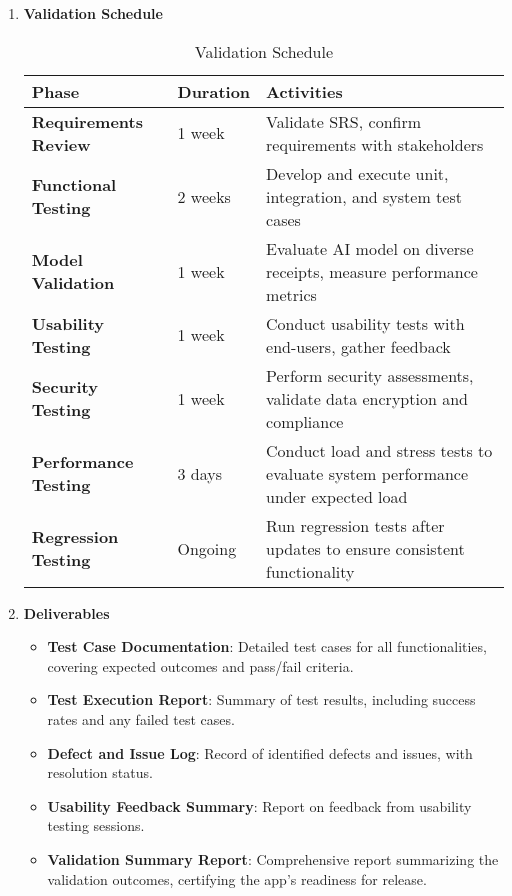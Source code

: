 \documentclass[12pt, titlepage]{article}
\begin{document}
\begin{enumerate}
	\item \textbf{Validation Schedule} \\
	\begin{table}[h!]
	\caption{Validation Schedule}
	\noindent \begin{tabular}{|>{\raggedright\arraybackslash}p{3cm}|p{2cm}|>{\raggedright\arraybackslash}p{7cm}|}
		\hline
		\textbf{Phase} & \textbf{Duration} & \textbf{Activities} \\
		\hline
		\textbf{Requirements Review} & 1 week & Validate SRS, confirm requirements with stakeholders \\
		\hline
		\textbf{Functional Testing} & 2 weeks & Develop and execute unit, integration, and system test cases \\
		\hline
		\textbf{Model Validation} & 1 week & Evaluate AI model on diverse receipts, measure performance metrics \\
		\hline
		\textbf{Usability Testing} & 1 week & Conduct usability tests with end-users, gather feedback \\
		\hline
		\textbf{Security Testing} & 1 week & Perform security assessments, validate data encryption and compliance \\
		\hline
		\textbf{Performance Testing} & 3 days & Conduct load and stress tests to evaluate system performance under expected load \\
		\hline
		\textbf{Regression Testing} & Ongoing & Run regression tests after updates to ensure consistent functionality \\
		\hline
	\end{tabular}
	\end{table}
	\newpage
	\item \textbf{Deliverables}
	\begin{itemize}
		\item \textbf{Test Case Documentation}: Detailed test cases for all functionalities, covering expected outcomes and pass/fail criteria.
		\item \textbf{Test Execution Report}: Summary of test results, including success rates and any failed test cases.
		\item \textbf{Defect and Issue Log}: Record of identified defects and issues, with resolution status.
		\item \textbf{Usability Feedback Summary}: Report on feedback from usability testing sessions.
		\item \textbf{Validation Summary Report}: Comprehensive report summarizing the validation outcomes, certifying the app's readiness for release.

\end{itemize}
\end{enumerate}
\end{document}
